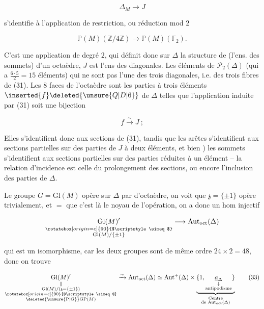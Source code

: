 \[
\Delta_M\longrightarrow J \tag*{(31)}
\]

s'identifie à l'application de restriction, ou réduction mod $2$

\[
\mathbb P(M)(\mathbb Z/4\mathbb Z)\longrightarrow\mathbb P(M)(\mathbb F_2).
\]

C'est une application de degré $2$, qui définit donc sur $\Delta$ la structure de (l'ens. des sommets) d'un octaèdre,  $J$ est l'ens des diagonales. Les   éléments de $\mathcal P_2(\Delta)$ (qui a $\frac{6\cdot5}{2}=15$ éléments) qui ne sont pas  l'une des trois diagonales, i.e. des trois fibres de (31). Les $8$ faces de l'octaèdre sont les parties à trois éléments $\inserted{f}\deleted{\unsure{Q|D|6}}$ de $\Delta$ telles que l'application induite par (31) soit une bijection

\[
f\xrightarrow{\sim}J\ ; \tag*{(32)}
\]

Elles s'identifient donc aux sections de (31), tandis que les arêtes s'identifient aux sections partielles sur des parties de $J$ à deux éléments, et bien
) les sommets s'identifient aux sections partielles sur des parties  réduites à un élément -- la relation d'incidence est celle du prolongement des sections, ou encore l'inclusion des parties de $\Delta$.

Le groupe $G=\mathrm{Gl}(M)$ opère sur $\Delta$ par  d'octaèdre, on voit que $\mathfrak z=\{\pm1\}$ opère trivialement,  et $=$ que c'est là le noyau de l'opération, on a donc un hom injectif

\[
\underset{\substack{\rotatebox[origin=c]{90}{$\scriptstyle\simeq$}\\\mathrm{Gl}(M)/\{\pm1\}}}{\mathrm{Gl}(M)'}\longrightarrow\mathrm{Aut}_{\mathrm{oct}}(\Delta)
\]

\reversemarginpar{}\normalmarginpar

qui est un isomorphisme, car les deux groupes sont de  même ordre $24\times2=48$, donc on trouve

\[
\underset{\substack{\|\\\mathrm{Gl}(M)/(\mathfrak z=\{\pm1\})\\\rotatebox[origin=c]{90}{$\scriptstyle\simeq$}\\\deleted{\unsure{\mathrm P|\mathrm G}}\mathrm{GP}(M)}}{\mathrm{Gl}(M)'}
\xrightarrow{\sim}\mathrm{Aut}_{\mathrm{oct}}(\Delta)\simeq\mathrm{Aut}^+(\Delta)\times
\underbrace{\{1,\underset{\substack{\downarrow\\\text{antipodisme}}}{\underline a_\Delta}\}}_{\substack{\text{Centre}\\\text{de }\mathrm{Aut}_{\mathrm{oct}}(\Delta)}}
\tag*{(33)}
\]

